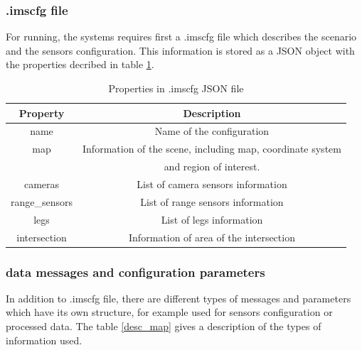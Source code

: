 \subsubsection{.imscfg file}

For running, the systems requires first a .imscfg file which describes the scenario and the sensors configuration. This information is stored as a JSON object with the properties decribed in table \ref{imscfg_file}.

\begin{table}[ht!]
\footnotesize
\centering
\begin{tabular}{|c | c|}
\hline
\textbf{Property} & \textbf{Description} \\
\hline
name & Name of the configuration \\
\hline
map & Information of the scene, including map, coordinate system \\ 
 & and region of interest. \\
\hline
cameras & List of camera sensors information \\
\hline
range\_sensors & List of range sensors information \\
\hline
legs & List of legs information \\
\hline
intersection & Information of area of the intersection \\
\hline
\end{tabular}
\caption{Properties in .imscfg JSON file}
\label{imscfg_file}
\end{table}

\subsubsection{data messages and configuration parameters}

In addition to .imscfg file, there are different types of messages and parameters which have its own structure, for example used for sensors configuration or processed data. The table \ref{desc_map} gives a description of the types of information used.

